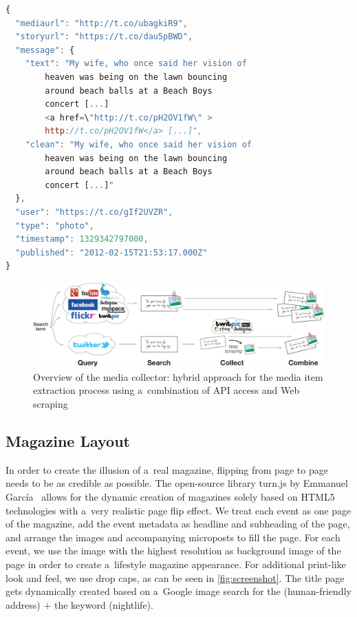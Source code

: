 \documentclass{acm_proc_article-sp}
\begin{document}
{\begin{lstlisting}[language=JavaScript,caption={Sample output of the media collector showing a~\mbox{Google+} post (edited for legibility, URLs shortened).},label={lst:media}]
{
  "mediaurl": "http://t.co/ubagkiR9",
  "storyurl": "https://t.co/dau5pBWD",
  "message": {
    "text": "My wife, who once said her vision of
        heaven was being on the lawn bouncing
        around beach balls at a Beach Boys
        concert [...]
        <a href=\"http://t.co/pH2OV1fW\" >
        http://t.co/pH2OV1fW</a> [...]",
    "clean": "My wife, who once said her vision of
        heaven was being on the lawn bouncing
        around beach balls at a Beach Boys
        concert [...]"
  },
  "user": "https://t.co/gIf2UVZR",
  "type": "photo",
  "timestamp": 1329342797000,
  "published": "2012-02-15T21:53:17.000Z"
}
\end{lstlisting}

\begin{figure}[htb!]
\centering
\includegraphics[width=0.8\linewidth]{./architecture.pdf}
\caption{Overview of the media collector: hybrid approach for the media item extraction process using a~combination of API access and Web scraping}
\label{fig:architecture}
\end{figure}

\subsection{Magazine Layout}
In order to create the illusion of a~real magazine,
flipping from page to page needs to be as credible as possible.
The open-source library turn.js by Emmanuel García~\cite{TurnJs2012}
allows for the dynamic creation of magazines solely based on HTML5 technologies
with a~very realistic page flip effect.
We treat each event as one page of the magazine,
add the event metadata as headline and subheading of the page,
and arrange the images and accompanying microposts to fill the page.
For each event, we use the image with the highest resolution
as background image of the page in order to create a~lifestyle magazine appearance.
For additional print-like look and feel, we use drop caps,
as can be seen in \autoref{fig:screenshot}.
The title page gets dynamically created based on a~Google image search
for the (human-friendly address) $+$ the keyword (nightlife).

}
\end{document}
